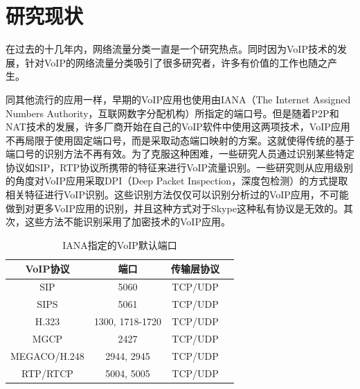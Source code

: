 
\section{研究现状}
在过去的十几年内，网络流量分类一直是一个研究热点。同时因为VoIP技术的发展，针对VoIP的网络流量分类吸引了很多研究者，许多有价值的工作也随之产生。

同其他流行的应用一样，早期的VoIP应用也使用由IANA（The Internet Assigned Numbers Authority，互联网数字分配机构）所指定的端口号。但是随着P2P和NAT技术的发展，许多厂商开始在自己的VoIP软件中使用这两项技术，VoIP应用不再局限于使用固定端口号，而是采取动态端口映射的方案。这就使得传统的基于端口号的识别方法不再有效。为了克服这种困难，一些研究人员\supercite{14, 16}通过识别某些特定协议如SIP，RTP协议所携带的特征来进行VoIP流量识别。一些研究\supercite{18}则从应用级别的角度对VoIP应用采取DPI（Deep Packet Inspection，深度包检测）的方式提取相关特征进行VoIP识别。这些识别方法仅仅可以识别分析过的VoIP应用，不可能做到对更多VoIP应用的识别，并且这种方式对于Skype这种私有协议是无效的。其次，这些方法不能识别采用了加密技术的VoIP应用。

\begin{table} [thb]
\caption{IANA指定的VoIP默认端口}\label{tab:21}
\small
\centering
{
\begin{tabular}{cccc}
  \toprule
        VoIP协议 & 端口 & 传输层协议 \\
  \midrule
        SIP & 5060 & TCP/UDP \\
        SIPS & 5061 & TCP/UDP \\
        H.323 & 1300, 1718-1720 & TCP/UDP\\
        MGCP & 2427 & TCP/UDP\\
        MEGACO/H.248 & 2944, 2945 & TCP/UDP\\
        RTP/RTCP & 5004, 5005 & TCP/UDP\\
 \bottomrule
\end{tabular}
}
\end{table}

